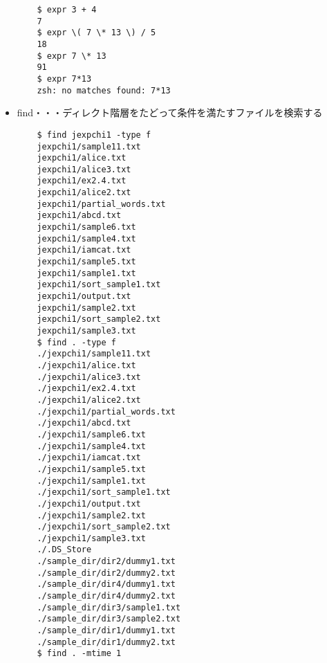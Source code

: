 \documentclass[a4paper,12pt]{jarticle}
\begin{document}
\begin{itemize}
\begin{lstlisting}
    $ expr 3 + 4
    7
    $ expr \( 7 \* 13 \) / 5
    18
    $ expr 7 \* 13
    91
    $ expr 7*13
    zsh: no matches found: 7*13
                           \end{lstlisting}
          \clearpage
    \item find・・・ディレクト階層をたどって条件を満たすファイルを検索する
          \begin{lstlisting}
    $ find jexpchi1 -type f
    jexpchi1/sample11.txt
    jexpchi1/alice.txt
    jexpchi1/alice3.txt
    jexpchi1/ex2.4.txt
    jexpchi1/alice2.txt
    jexpchi1/partial_words.txt
    jexpchi1/abcd.txt
    jexpchi1/sample6.txt
    jexpchi1/sample4.txt
    jexpchi1/iamcat.txt
    jexpchi1/sample5.txt
    jexpchi1/sample1.txt
    jexpchi1/sort_sample1.txt
    jexpchi1/output.txt
    jexpchi1/sample2.txt
    jexpchi1/sort_sample2.txt
    jexpchi1/sample3.txt
    $ find . -type f
    ./jexpchi1/sample11.txt
    ./jexpchi1/alice.txt
    ./jexpchi1/alice3.txt
    ./jexpchi1/ex2.4.txt
    ./jexpchi1/alice2.txt
    ./jexpchi1/partial_words.txt
    ./jexpchi1/abcd.txt
    ./jexpchi1/sample6.txt
    ./jexpchi1/sample4.txt
    ./jexpchi1/iamcat.txt
    ./jexpchi1/sample5.txt
    ./jexpchi1/sample1.txt
    ./jexpchi1/sort_sample1.txt
    ./jexpchi1/output.txt
    ./jexpchi1/sample2.txt
    ./jexpchi1/sort_sample2.txt
    ./jexpchi1/sample3.txt
    ./.DS_Store
    ./sample_dir/dir2/dummy1.txt
    ./sample_dir/dir2/dummy2.txt
    ./sample_dir/dir4/dummy1.txt
    ./sample_dir/dir4/dummy2.txt
    ./sample_dir/dir3/sample1.txt
    ./sample_dir/dir3/sample2.txt
    ./sample_dir/dir1/dummy1.txt
    ./sample_dir/dir1/dummy2.txt
    $ find . -mtime 1


\end{lstlisting}
\end{itemize}
\end{document}
